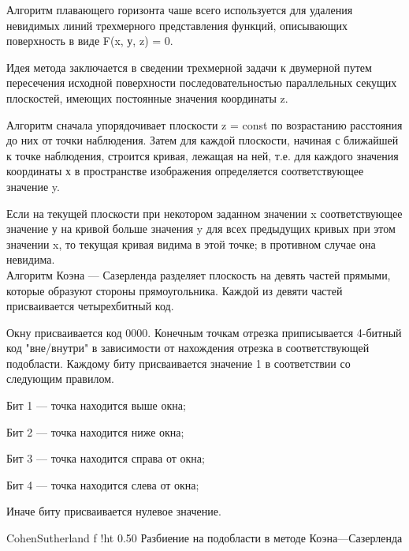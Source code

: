 
Алгоритм плавающего горизонта чаше всего используется для удаления невидимых линий трехмерного представления функций, описывающих поверхность в виде F(x, у, z) = 0.

Идея метода заключается в сведении трехмерной задачи к двумерной путем пересечения исходной поверхности последовательностью параллельных секущих плоскостей, имеющих постоянные значения координаты z.

Алгоритм сначала упорядочивает плоскости z = const по возрастанию расстояния до них от точки наблюдения. Затем для каждой плоскости, начиная с ближайшей к точке наблюдения, строится кривая, лежащая на ней, т.е. для каждого значения координаты х в пространстве изображения определяется соответствующее значение y.

Если на текущей плоскости при некотором заданном значении x соответствующее значение у на кривой больше значения y для всех предыдущих кривых при этом значении x, то текущая кривая видима в этой точке; в противном случае она невидима.\\ %


Алгоритм Коэна --- Сазерленда разделяет плоскость на девять частей прямыми, которые образуют стороны прямоугольника. Каждой из девяти частей присваивается четырехбитный код.

Окну присваивается код 0000. Конечным точкам отрезка приписывается 4-битный код "вне/внутри" в зависимости от нахождения отрезка в соответствующей подобласти. Каждому биту присваивается значение 1 в соответствии со следующим правилом.

Бит 1 --- точка находится выше окна;

Бит 2 --- точка находится ниже окна;

Бит 3 --- точка находится справа от окна;

Бит 4 --- точка находится слева от окна;

Иначе биту присваивается нулевое значение.

{CohenSutherland}
{f}
{!ht}
{0.50\textwidth}
{Разбиение на подобласти в методе Коэна---Сазерленда}

